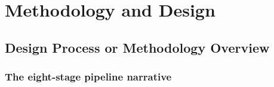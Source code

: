 %

\chapter{Methodology and Design}
\label{ch:methodology}


\section{Design Process or Methodology Overview}
\label{sec:design-process}

\subsection{The eight-stage pipeline narrative}
\label{sec:overview-pipeline}

